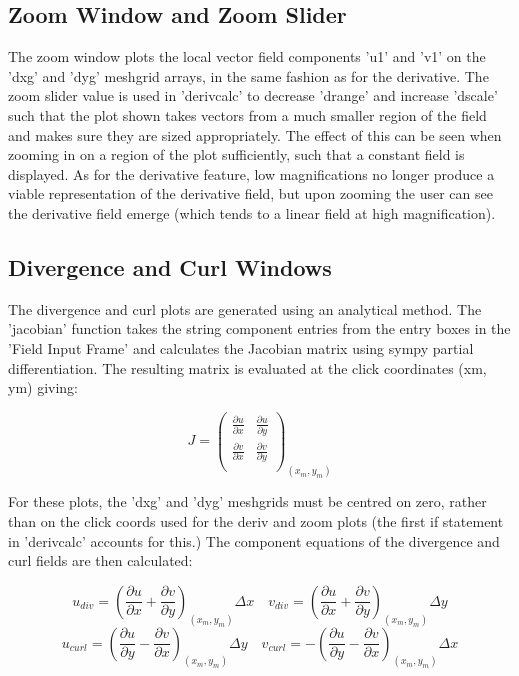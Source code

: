 \documentclass[12pt]{report}
\begin{document}
\subsection{Zoom Window and Zoom Slider}
The zoom window plots the local vector field components 'u1' and 'v1' on the 'dxg' and 'dyg' meshgrid arrays, in the same fashion as for the derivative. The zoom slider value is used in 'deriv\textunderscore calc' to decrease 'd\textunderscore range' and increase 'd\textunderscore scale' such that the plot shown takes vectors from a much smaller region of the field and makes sure they are sized appropriately. The effect of this can be seen when zooming in on a region of the plot sufficiently, such that a constant field is displayed. As for the derivative feature, low magnifications no longer produce a viable representation of the derivative field, but upon zooming the user can see the derivative field emerge (which tends to a linear field at high magnification). 

\subsection{Divergence and Curl Windows}
The divergence and curl plots are generated using an analytical method. The 'jacobian' function takes the string component entries from the entry boxes in the 'Field Input Frame' and calculates the Jacobian matrix using sympy partial differentiation. The resulting matrix is evaluated at the click coordinates (x\textunderscore m, y\textunderscore m) giving:

\begin{equation}
	J =
	\begin{pmatrix}
		\frac{\partial u}{\partial x} & \frac{\partial u}{\partial y} \\
		\frac{\partial v}{\partial x} & \frac{\partial v}{\partial y} \\
	\end{pmatrix}
	_{(x_m,y_m)}
\end{equation}

For these plots, the 'dxg' and 'dyg' meshgrids must be centred on zero, rather than on the click coords used for the deriv and zoom plots (the first if statement in 'deriv\textunderscore calc' accounts for this.) The component equations of the divergence and curl fields are then calculated:

\begin{equation}
	u_{div} = \left( \frac{\partial u}{\partial x} + \frac{\partial v}{\partial y} \right)_{(x_m,y_m)} \Delta x \quad
	v_{div} = \left( \frac{\partial u}{\partial x} + \frac{\partial v}{\partial y} \right)_{(x_m,y_m)} \Delta y	
\end{equation}
\begin{equation}
	u_{curl} = \left( \frac{\partial u}{\partial y} - \frac{\partial v}{\partial x} \right)_{(x_m,y_m)} \Delta y \quad
	v_{curl} = - \left( \frac{\partial u}{\partial y} - \frac{\partial v}{\partial x} \right)_{(x_m,y_m)} \Delta x
\end{equation}
\end{document}

